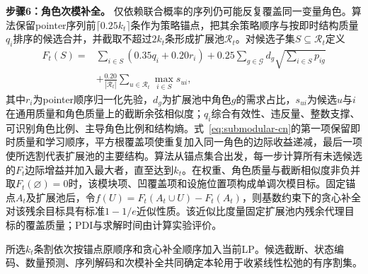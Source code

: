 \documentclass[journal]{IEEEtran}
\begin{document}
\noindent\textbf{步骤6：角色次模补全。} 仅依赖联合概率的序列仍可能反复覆盖同一变量角色。算法保留pointer序列前$\lceil0.25k_t\rceil$条作为策略锚点，把其余策略顺序与按即时结构质量$q_i$排序的候选合并，并截取不超过$2k_t$条形成扩展池$\mathcal R_t$。对候选子集$S\subseteq\mathcal R_t$定义
\begin{equation}
\begin{aligned}
F_t(S)={}&\sum_{i\in S}(0.35q_i+0.20r_i)
+0.25\sum_{g\in\mathcal G}d_g\sqrt{\sum_{i\in S}p_{ig}}\\
&+\frac{0.20}{|\mathcal R_t|}\sum_{u\in\mathcal R_t}\max_{i\in S}s_{ui},
\end{aligned}
\label{eq:submodular-cn}
\end{equation}
其中$r_i$为pointer顺序归一化先验，$d_g$为扩展池中角色$g$的需求占比，$s_{ui}$为候选$u$与$i$在通用质量和角色质量上的截断余弦相似度；$q_i$综合有效性、违反量、整数支撑、可识别角色比例、主导角色比例和结构熵。式~\eqref{eq:submodular-cn}的第一项保留即时质量和学习顺序，平方根覆盖项使重复加入同一角色的边际收益递减，最后一项使所选割代表扩展池的主要结构。算法从锚点集合出发，每一步计算所有未选候选的$F_t$边际增益并加入最大者，直至达到$k_t$。在权重、角色质量与截断相似度非负并取$F_t(\varnothing)=0$时，该模块项、凹覆盖项和设施位置项构成单调次模目标。固定锚点$A_t$及扩展池后，令$f(U)=F_t(A_t\cup U)-F_t(A_t)$，则基数约束下的贪心补全对该残余目标具有标准$1-1/e$近似性质\cite{nemhauser1978analysis}。该近似比度量固定扩展池内残余代理目标的覆盖质量；PDI与求解时间由计算实验评价。

所选$k_t$条割依次按锚点原顺序和贪心补全顺序加入当前LP。候选截断、状态编码、数量预测、序列解码和次模补全共同确定本轮用于收紧线性松弛的有序割集。
\end{document}
